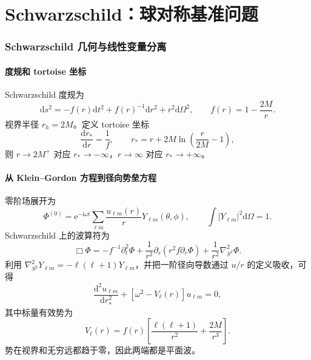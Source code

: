 \documentclass[UTF8,fontset=fandol,11pt,a4paper]{ctexart}
\newcommand{\dd}{\mathrm d}
\newcommand{\ii}{\mathrm i}
\newcommand{\ee}{\mathrm e}
\newcommand{\abs}[1]{\left|#1\right|}
\begin{document}
\part{Schwarzschild：球对称基准问题}

\section{Schwarzschild 几何与线性变量分离}
\label{sec:sch-linear}

\subsection{度规和 tortoise 坐标}

Schwarzschild 度规为
\begin{equation}
\dd s^2=-f(r)\dd t^2+f(r)^{-1}\dd r^2+r^2\dd\Omega^2,
\qquad f(r)=1-\frac{2M}{r}.
\end{equation}
视界半径 $r_h=2M$。定义 tortoise 坐标
\begin{equation}
\frac{\dd r_*}{\dd r}=\frac{1}{f},\qquad
r_*=r+2M\ln\left(\frac{r}{2M}-1\right),
\end{equation}
则 $r\to2M^+$ 对应 $r_*\to-\infty$，$r\to\infty$ 对应 $r_*\to+\infty$。

\subsection{从 Klein--Gordon 方程到径向势垒方程}

零阶场展开为
\begin{equation}
\Phi^{(0)}=\ee^{-\ii\omega t}
\sum_{\ell m}\frac{u_{\ell m}(r)}{r}Y_{\ell m}(\theta,\phi),
\qquad \int\abs{Y_{\ell m}}^2\dd\Omega=1.
\end{equation}
Schwarzschild 上的波算符为
\begin{equation}
\Box\Phi=-f^{-1}\partial_t^2\Phi
+\frac{1}{r^2}\partial_r(r^2f\partial_r\Phi)
+\frac{1}{r^2}\nabla_{S^2}^2\Phi.
\end{equation}
利用 $\nabla_{S^2}^2Y_{\ell m}=-\ell(\ell+1)Y_{\ell m}$，并把一阶径向导数通过 $u/r$ 的定义吸收，可得
\begin{equation}
\boxed{
\frac{\dd^2u_{\ell m}}{\dd r_*^2}
+\left[\omega^2-V_\ell(r)\right]u_{\ell m}=0,}
\label{eq:sch-rw}
\end{equation}
其中标量有效势为
\begin{equation}
V_\ell(r)=f(r)\left[
\frac{\ell(\ell+1)}{r^2}+\frac{2M}{r^3}
\right].
\label{eq:sch-pot}
\end{equation}
势在视界和无穷远都趋于零，因此两端都是平面波。
\end{document}
